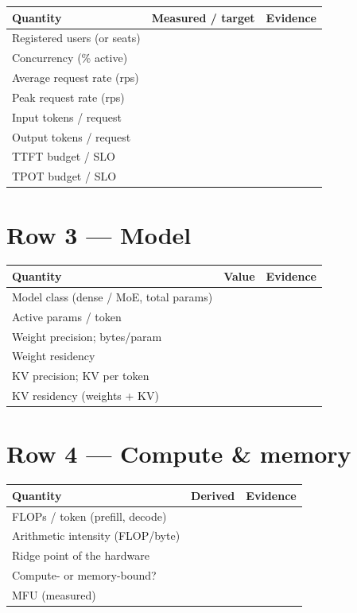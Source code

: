 \begin{tabular}{@{}p{4.6cm}p{3.0cm}p{5.2cm}@{}}
\toprule
\textbf{Quantity} & \textbf{Measured / target} & \textbf{Evidence} \\
\midrule
Registered users (or seats) & & \\
Concurrency (\% active) & & \\
Average request rate (rps) & & \\
Peak request rate (rps) & & \\
Input tokens / request & & \\
Output tokens / request & & \\
TTFT budget / SLO & & \\
TPOT budget / SLO & & \\
\bottomrule
\end{tabular}

\section*{Row 3 --- Model} \label{ws:model}

\begin{tabular}{@{}p{4.6cm}p{3.0cm}p{5.2cm}@{}}
\toprule
\textbf{Quantity} & \textbf{Value} & \textbf{Evidence} \\
\midrule
Model class (dense / MoE, total params) & & \\
Active params / token & & \\
Weight precision; bytes/param & & \\
Weight residency & & \\
KV precision; KV per token & & \\
KV residency (weights + KV) & & \\
\bottomrule
\end{tabular}

\section*{Row 4 --- Compute \& memory} \label{ws:compute}

\begin{tabular}{@{}p{4.6cm}p{3.0cm}p{5.2cm}@{}}
\toprule
\textbf{Quantity} & \textbf{Derived} & \textbf{Evidence} \\
\midrule
FLOPs / token (prefill, decode) & & \\
Arithmetic intensity (FLOP/byte) & & \\
Ridge point of the hardware & & \\
Compute- or memory-bound? & & \\
MFU (measured) & & \\
\bottomrule
\end{tabular}

